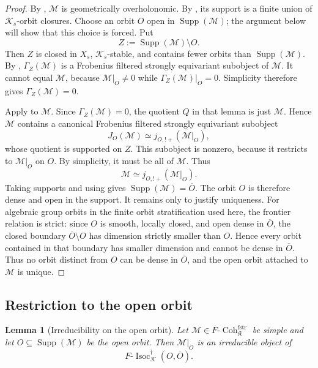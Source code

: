 \documentclass[11pt]{amsart}
\theoremstyle{plain}
\newtheorem{lemma}{Lemma}[section]
\theoremstyle{definition}
\theoremstyle{remark}
\newcommand{\Coh}{\operatorname{Coh}}
\newcommand{\Isoc}{\operatorname{Isoc}}
\newcommand{\Supp}{\operatorname{Supp}}
\newcommand{\fstr}{\mathrm{fstr}}
\begin{document}
\begin{proof}
By , \(\mathcal M\) is geometrically
overholonomic.  By , its support is a finite
union of \(\mathcal K_s\)-orbit closures.  Choose an orbit \(O\) open in
\(\Supp(\mathcal M)\); the argument below will show that this choice is forced.
Put
\[
  Z:=\Supp(\mathcal M)\setminus O.
\]
Then \(Z\) is closed in \(X_s\), \(\mathcal K_s\)-stable, and contains fewer
orbits than \(\Supp(\mathcal M)\).  By
, \(\Gamma_Z(\mathcal M)\) is a Frobenius
filtered strongly equivariant subobject of \(\mathcal M\).  It cannot equal
\(\mathcal M\), because \(\mathcal M|_O\neq0\) while
\(\Gamma_Z(\mathcal M)|_O=0\).  Simplicity therefore gives
\(\Gamma_Z(\mathcal M)=0\).

Apply  to \(\mathcal M\).  Since
\(\Gamma_Z(\mathcal M)=0\), the quotient \(Q\) in that lemma is just
\(\mathcal M\).  Hence \(\mathcal M\) contains a canonical Frobenius filtered
strongly equivariant subobject
\[
  J_O(\mathcal M)\simeq j_{O,!+}(\mathcal M|_O),
\]
whose quotient is supported on \(Z\).  This subobject is nonzero, because it
restricts to \(\mathcal M|_O\) on \(O\).  By simplicity, it must be all of
\(\mathcal M\).  Thus
\[
  \mathcal M\simeq j_{O,!+}(\mathcal M|_O).
\]
Taking supports and using  gives
\(\Supp(\mathcal M)=\overline O\).  The orbit \(O\) is therefore dense and open
in the support.  It remains only to justify uniqueness.  For algebraic group
orbits in the finite orbit stratification used here, the frontier relation is
strict: since \(O\) is smooth, locally closed, and open dense in \(\overline O\),
the closed boundary \(\overline O\setminus O\) has dimension strictly smaller
than \(O\).  Hence every orbit contained in that boundary has smaller dimension
and cannot be dense in \(\overline O\).  Thus no orbit distinct from \(O\) can
be dense in \(\overline O\), and the open orbit attached to \(\mathcal M\) is
unique.
\end{proof}

\subsection{Restriction to the open orbit}

\begin{lemma}[Irreducibility on the open orbit]
\label{lem:restriction-irreducible}
Let \(\mathcal M\in F\text{-}\Coh^{\fstr}_{\mathfrak K}\) be simple and let
\(O\subseteq \Supp(\mathcal M)\) be the open orbit. Then \(\mathcal M|_O\) is an
irreducible object of
\[
  F\text{-}\Isoc^{\dagger}_{\mathcal K}(O,\overline O).
\]
\end{lemma}
\end{document}
